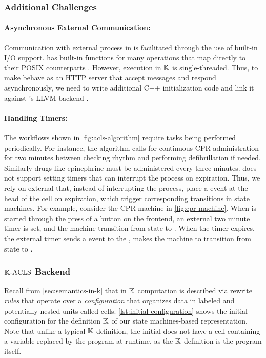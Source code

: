 \subsubsection{Additional Challenges}

\paragraph{Asynchronous External Communication:}
Communication with external process in \K{} is facilitated
through the use of built-in I/O support. \K has built-in
functions for many operations that map directly to their
POSIX counterparts \cite{KFrameworkIOUrl}. However,
execution in $\mathbb{K}$ is single-threaded. Thus, to make \K{}
behave as an HTTP \cite{HTTPUrl} server that accept messages and respond asynchronously,
we need to write additional C++ initialization code and link it against
\K's LLVM backend \cite{KFrameworkBackendsUrl}.

\paragraph{Handling Timers:}
The \ALS{} workflows shown in \autoref{fig:acls-algorithm} require
tasks being performed periodically. For instance, the algorithm
calls for continuous CPR administration for two minutes
between checking rhythm and performing defibrillation if needed.
Similarly drugs like epinephrine must be administered every three minutes.
\K{} does not support setting timers that can interrupt the \K{} process
on expiration. Thus, we rely on external  that, instead
of interrupting the \K{} process, place a  event
at the head of the  cell on expiration, which
trigger corresponding transitions in state machines. For example,
consider the CPR machine in \autoref{fig:cpr-machine}. When
\CPR{} is started through the press of a button on the frontend,
an external two minute timer is set, and the machine
transition from state  to .
When the timer expires, the external timer sends a 
event to the \K{}, makes the \CPR{} machine to transition from
state  to .

\subsubsection{$\mathbb{K}{}\text{-ACLS}{}$ Backend}
Recall from \autoref{sec:semantics-in-k} that in $\mathbb{K}$ computation
is described via rewrite \emph{rules} that operate over a \emph{configuration}
that organizes data in labeled and potentially nested units called cells.
\autoref{lst:initial-configuration} shows the initial configuration for
the definition $\mathbb{K}$ of our state machines-based representation.
Note that unlike a typical $\mathbb{K}{}$ definition, the initial 
does not have a  cell containing a  variable
replaced by the program \AST{} at runtime, as the $\mathbb{K}$ definition is the
program itself.


